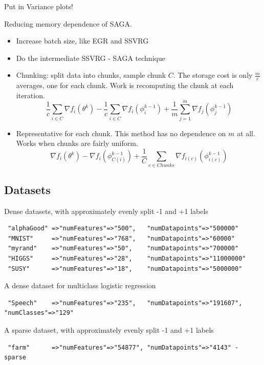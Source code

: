 \documentclass[11pt]{article}
\begin{document}
Put in Variance plots!

Reducing memory dependence of SAGA. 

\begin{itemize}
	\item Increase batch size, like EGR and SSVRG
	\item Do the intermediate SSVRG - SAGA technique
	\item Chunking: split data into chunks, sample chunk $C$. The storage cost is only $\frac{m}{c}$ averages, one for each chunk. Work is recomputing the chunk at each iteration. 
	\begin{equation}
		\frac{1}{c} \sum_{i \in C} \nabla f_i(\theta^k) - \frac{1}{c} \sum_{i \in C} \nabla f_i(\phi_i^{k-1})  + \frac{1}{m} \sum_{j=1}^m \nabla f_j(\phi_j^{k-1})
		\end{equation}
	\item Representative for each chunk. This method has no dependence on $m$ at all. Works when chunks are fairly uniform. 
	\begin{equation}
		\nabla f_i(\theta^k) -\nabla f_i(\phi_{C(i)}^{k-1})  + \frac{1}{C} \sum_{c \in Chunks} \nabla f_{i(c)}(\phi_{i(c)}^{k-1})
	\end{equation}
\end{itemize}

\subsection{Datasets}
Dense datasets, with approximately evenly split -1 and +1 labels
\begin{verbatim}
 "alphaGood" =>"numFeatures"=>"500",   "numDatapoints"=>"500000"
 "MNIST"     =>"numFeatures"=>"768",   "numDatapoints"=>"60000"
 "myrand"    =>"numFeatures"=>"50",    "numDatapoints"=>"700000"
 "HIGGS"     =>"numFeatures"=>"28",    "numDatapoints"=>"11000000"
 "SUSY"      =>"numFeatures"=>"18",    "numDatapoints"=>"5000000"
\end{verbatim}

A dense dataset for multiclass logistic regression
\begin{verbatim}
 "Speech"    =>"numFeatures"=>"235",   "numDatapoints"=>"191607", "numClasses"=>"129"
\end{verbatim}

A sparse dataset, with approximately evenly split -1 and +1 labels 
\begin{verbatim}
 "farm"      =>"numFeatures"=>"54877", "numDatapoints"=>"4143" - sparse
\end{verbatim}
\end{document}

